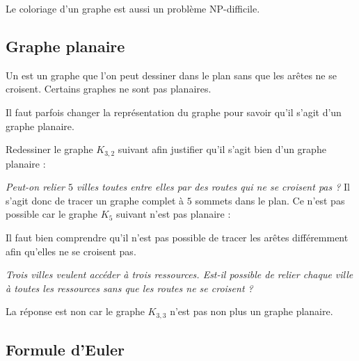 \documentclass[11pt,class=report,crop=false]{standalone}
\begin{document}
Le coloriage d'un graphe est aussi un problème NP-difficile.


\subsection{Graphe planaire}


Un  est un graphe que l'on peut dessiner dans le plan sans que les arêtes ne se croisent. Certains graphes ne sont pas planaires.



Il faut parfois changer la représentation du graphe pour savoir qu'il s'agit d'un graphe planaire.


Redessiner le graphe $K_{3,2}$ suivant afin justifier qu'il s'agit bien d'un graphe planaire :




\medskip

\emph{Peut-on relier $5$ villes toutes entre elles par des routes qui ne se croisent pas ?}
Il s'agit donc de tracer un graphe complet à $5$ sommets dans le plan. 
Ce n'est pas possible car le graphe $K_5$ suivant n'est pas planaire :



\medskip


Il faut bien comprendre qu'il n'est pas possible de tracer les arêtes différemment afin qu'elles ne se croisent pas.


\medskip

\emph{Trois villes veulent accéder à trois ressources. Est-il possible de relier chaque ville à toutes les ressources sans que les routes ne se croisent ?}

La réponse est non car le graphe $K_{3,3}$ n'est pas non plus un graphe planaire.


\subsection{Formule d'Euler}

\end{document}
